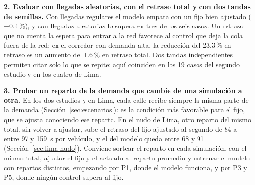 \noindent\textbf{2. Evaluar con llegadas aleatorias, con el retraso
total y con dos tandas de semillas.} Con llegadas regulares el modelo
empata con un fijo bien ajustado ($-0.4$\,\%), y con llegadas
aleatorias lo supera en tres de los seis casos. Un retraso que no cuenta la espera para entrar a la red
favorece al control que deja la cola fuera de la red: en el corredor
con demanda alta, la reducción del 23.3\,\% en retraso es un aumento
del 1.6\,\% en retraso total. Dos tandas independientes permiten citar
solo lo que se repite: aquí coinciden en los 19 casos del segundo
estudio y en los cuatro de Lima.

\noindent\textbf{3. Probar un reparto de la demanda que cambie de una
simulación a otra.} En los dos estudios y en Lima, cada calle recibe
siempre la misma parte de la demanda (Sección~\ref{sec:escenarios}): es
la condición más favorable para el fijo, que se ajusta conociendo ese
reparto. En el nudo de Lima, otro reparto del mismo total, sin volver a
ajustar, sube el retraso del fijo ajustado al segundo de 84 a entre 97 y
159~s por vehículo, y el del modelo queda entre 68 y 91
(Sección~\ref{sec:lima-nudo}).
Conviene sortear el reparto en cada simulación, con el mismo total,
ajustar el fijo y el actuado al reparto promedio y entrenar el modelo
con repartos distintos, empezando por P1, donde el modelo funciona, y
por P3 y P5, donde ningún control supera al fijo.

